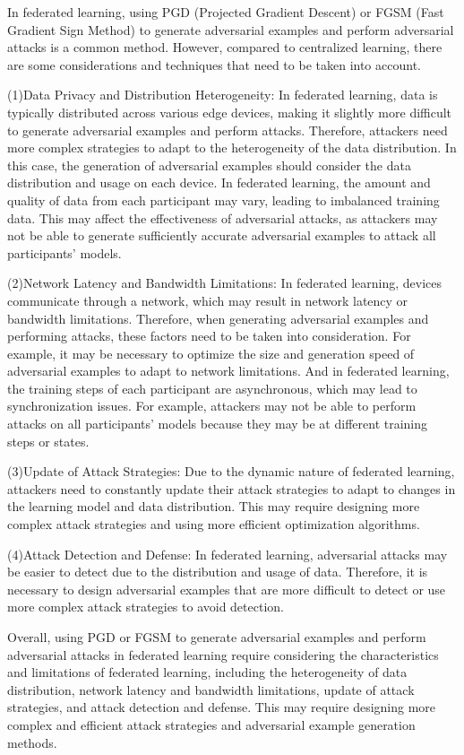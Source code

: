 \documentclass[pdflatex,sn-mathphys-num]{sn-jnl}%
\theoremstyle{thmstyleone}%
\theoremstyle{thmstyletwo}%
\theoremstyle{thmstylethree}%
\begin{document}
In federated learning, using PGD (Projected Gradient Descent) or FGSM
(Fast Gradient Sign Method) to generate adversarial examples and perform
adversarial attacks is a common method. However, compared to centralized
learning, there are some considerations and techniques that need to be
taken into account.

(1)Data Privacy and Distribution Heterogeneity: In
federated learning, data is typically distributed across
various edge devices, making it slightly more diﬀicult to
generate adversarial examples and perform attacks.
Therefore, attackers need more complex strategies to adapt to
the heterogeneity of the data distribution. In this case,
the generation of adversarial examples should consider the
data distribution and usage on each device. In federated
learning, the amount and quality of data from each
participant may vary, leading to imbalanced training data.
This may affect the effectiveness of adversarial attacks, as
attackers may not be able to generate suﬀiciently accurate
adversarial examples to attack all participants' models.

(2)Network Latency and Bandwidth Limitations:
In federated learning, devices communicate through a
network, which may result in network latency or
bandwidth limitations. Therefore, when generating adversarial
examples and performing attacks, these factors need to
be taken into consideration. For example, it may be
necessary to optimize the size and generation speed of
adversarial examples to adapt to network limitations. And
in federated learning, the training steps of each participant
are asynchronous, which may lead to synchronization
issues. For example, attackers may not be able to perform
attacks on all participants' models because they may be
at different training steps or states.

(3)Update of Attack Strategies: Due to the dynamic
nature of federated learning, attackers need to constantly
update their attack strategies to adapt to changes in the
learning model and data distribution. This may require
designing more complex attack strategies and using more
eﬀicient optimization algorithms.

(4)Attack Detection and Defense: In federated learning,
adversarial attacks may be easier to detect due to the
distribution and usage of data. Therefore, it is necessary
to design adversarial examples that are more diﬀicult to
detect or use more complex attack strategies to avoid
detection.

Overall, using PGD or FGSM to generate adversarial
examples and perform adversarial attacks in federated
learning require considering the characteristics and limitations of federated learning, including the heterogeneity
of data distribution, network latency and bandwidth limitations,
update of attack strategies, and attack detection
and defense. This may require designing more complex
and eﬀicient attack strategies and adversarial example
generation methods.
\end{document}
